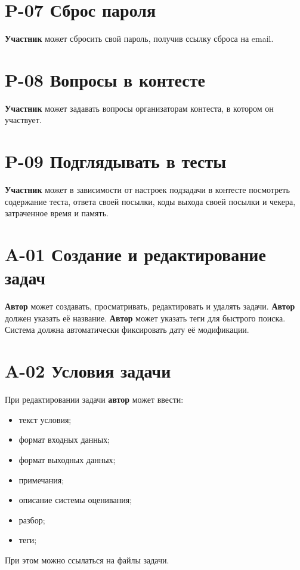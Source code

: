 \documentclass{book}
\begin{document}
\newpage \section*{P-07 Сброс пароля}
\textbf{Участник} может сбросить свой пароль, получив ссылку сброса на email.

\newpage \section*{P-08 Вопросы в контесте}
\textbf{Участник} может задавать вопросы организаторам контеста, в котором он участвует.

\newpage \section*{P-09 Подглядывать в тесты}
\textbf{Участник} может в зависимости от настроек подзадачи в контесте посмотреть
содержание теста, ответа своей посылки, коды выхода своей посылки и чекера,
затраченное время и память.


\newpage \section*{A-01 Создание и редактирование задач}
\textbf{Автор} может создавать, просматривать, редактировать и удалять задачи. 
\textbf{Автор} должен указать её название.
\textbf{Автор} может указать теги для быстрого поиска.
Система должна автоматически фиксировать дату её модификации.

\newpage \section*{A-02 Условия задачи}
При редактировании задачи \textbf{автор} может ввести:
\begin{itemize}\setlength\itemsep{0pt}
	\item текст условия;
	\item формат входных данных;
	\item формат выходных данных;
	\item примечания;
	\item описание системы оценивания;
	\item разбор;
	\item теги;
\end{itemize}

При этом можно ссылаться на файлы задачи.
\end{document}
